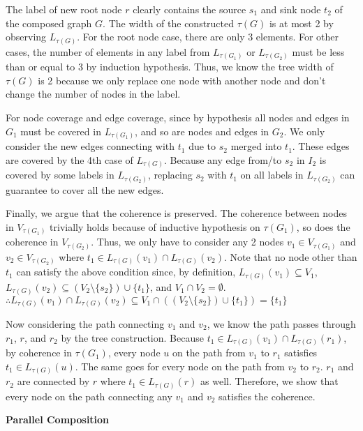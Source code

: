 \documentclass[10pt]{homework}
\begin{document}
\begin{induction}
The label of new root node \(r\) clearly contains the source \(s_1\) and sink
node \(t_2\) of the composed graph \(G\).
The width of the constructed \(\tau(G)\) is at most 2 by observing \(L_{\tau(G)}\).
For the root node case, there are only 3 elements.
For other cases, the number of elements in any label from \(L_{\tau(G_1)}\) or
\(L_{\tau(G_2)}\) must be less than or equal to 3 by induction hypothesis.
Thus, we know the tree width of \(\tau(G)\) is 2 because we only replace one node
 with another node and don't change the number of nodes in the label.

For node coverage and edge coverage, since by hypothesis all nodes and edges in
\(G_1\) must be covered in \(L_{\tau(G_1)}\), and so are nodes and edges in \(G_2\).
We only consider the new edges connecting with \(t_1\) due to \(s_2\) merged into \(t_1\).
These edges are covered by the 4th case of \(L_{\tau(G)}\).
Because any edge from/to \(s_2\) in \(I_2\) is covered by some labels in \(L_{\tau(G_2)}\),
replacing \(s_2\) with \(t_1\) on all labels in \(L_{\tau(G_2)}\) can guarantee to cover
all the new edges.

Finally, we argue that the coherence is preserved.
The coherence between nodes in \(V_{\tau(G_1)}\) trivially holds because of inductive hypothesis on \(\tau(G_1)\),
so does the coherence in \(V_{\tau(G_2)}\).
Thus, we only have to consider any 2 nodes \(v_1 \in V_{\tau(G_1)}\) and
\(v_2 \in V_{\tau(G_2)}\) where \(t_1 \in L_{\tau(G)}(v_1)\cap L_{\tau(G)}(v_2)\).
Note that no node other than \(t_1\) can satisfy the above condition since, by definition,
\(L_{\tau(G)}(v_1) \subseteq V_1\), \(L_{\tau(G)}(v_2) \subseteq (V_2 \setminus \{s_2\})\cup\{t_1\}\),
and \(V_1 \cap V_2 = \emptyset\).
\(\therefore L_{\tau(G)}(v_1)\cap L_{\tau(G)}(v_2) \subseteq V_1 \cap ((V_2 \setminus \{s_2\})\cup\{t_1\}) = \{t_1\}\)

Now considering the path connecting \(v_1\) and \(v_2\),
we know the path passes through \(r_1\), \(r\), and \(r_2\) by the tree construction.
Because \(t_1 \in L_{\tau(G)}(v_1) \cap L_{\tau(G)}(r_1)\),
by coherence in \(\tau(G_1)\), every node \(u\) on the path from \(v_1\) to \(r_1\) satisfies \(t_1 \in L_{\tau(G)}(u)\).
The same goes for every node on the path from \(v_2\) to \(r_2\).
\(r_1\) and \(r_2\) are connected by \(r\) where \(t_1 \in L_{\tau(G)}(r)\) as well.
Therefore, we show that every node on the path connecting any \(v_1\) and \(v_2\)
satisfies the coherence.

\textbf{Parallel Composition}


\end{induction}
\end{document}
